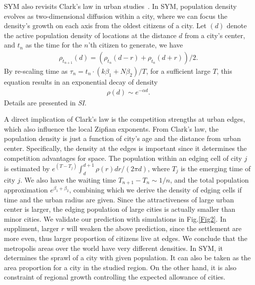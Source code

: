 \documentclass[reprint,unsortedaddress,amsmath,amssymb,aps,prl,showkeys]{revtex4-2}
\begin{document}
SYM also revisits Clark's law in urban studies~\cite{clark1951urban}. In SYM, population density evolves as two-dimensional diffusion within a city\cite{doi:10.1137/0150099}, where we can focus the density's growth on each axis from the oldest citizens of a city. Let $
(d)$ denote the active population density of locations at the distance $d$ from a city's center, and $t_n$ as the time for the $n$'th citizen to generate, we have 
\begin{align}
	\rho_{t_{n+1}}(d) = (\rho_{t_{n}}(d-r) + \rho_{t_{n}}(d+r) )/2.\label{loc_den}  
\end{align} By re-scaling time as $\tau_n = t_n\cdot (k\beta_1+N\beta_2)/T$, for a sufficient large $T$, this equation results in an exponential decay of density
\begin{align}
	\rho(d)\sim e^{-\alpha d}\label{clark_eq}.
\end{align} Details are presented in \textit{SI}. 

A direct implication of Clark's law is the competition strengths at urban edges, which also influence the local Zipfian exponents. From Clark's law, the population density is just a function of city's age and the distance from urban center. Specifically, the density at the edges is important since it determines the competition advantages for space. The population within an edging cell of city $j$ is estimated by $e^{(T-T_j)}\int_{d}^{d+1}\rho(r)dr/(2\pi d)$, where $T_j$ is the emerging time of city $j$. We also have the waiting time $T_{n+1}-T_{n}\sim 1/n$, and the total population approximation $e^{\beta_1+\beta_2}$, combining which we derive the density of edging cells if time and the urban radius are given. Since the attractiveness of large urban center is larger, the edging population of large cities is actually smaller than minor cities. We validate our prediction with simulations in Fig.\@\ref{Fig2}. %
In suppliment, larger $r$ will weaken the above prediction, since the settlement are more even, thus larger proportion of citizens live at edges. We conclude that the metropolis areas over the world have very different densities. In SYM, it determines the sprawl of a city with given population. It can also be taken as the area proportion for a city in the studied region. On the other hand, it is also constraint of regional growth controlling the expected allowance of cities. %
\end{document}

